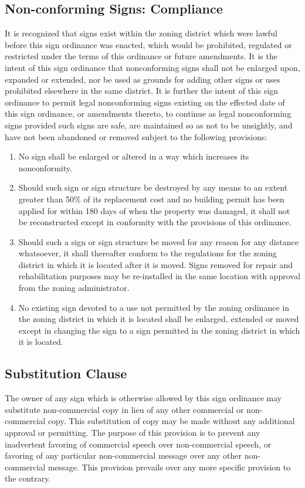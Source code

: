 \subsection{Non-conforming Signs: Compliance}
It is recognized that signs exist within the zoning district which were lawful before this sign ordinance was enacted, which would be prohibited, regulated or restricted under the terms of this ordinance or future amendments.  It is the intent of this sign ordinance that nonconforming signs shall not be enlarged upon, expanded or extended, nor be used as grounds for adding other signs or uses prohibited elsewhere in the same district.  It is further the intent of this sign ordinance to permit legal nonconforming signs existing on the effected date of this sign ordinance, or amendments thereto, to continue as legal nonconforming signs provided such signs are safe, are maintained so as not to be unsightly, and have not been abandoned or removed subject to the following provisions:
\begin{enumerate}[{\indent}1)]
    \item No sign shall be enlarged or altered in a way which increases its nonconformity.
    \item Should such sign or sign structure be destroyed by any means to an extent greater than 50\% of its replacement cost and no building permit has been applied for within 180 days of when the property was damaged, it shall not be reconstructed except in conformity with the provisions of this ordinance.
    \item Should such a sign or sign structure be moved for any reason for any distance whatsoever, it shall thereafter conform to the regulations for the zoning district in which it is located after it is moved.  Signs removed for repair and rehabilitation purposes may be re-installed in the same location with approval from the zoning administrator.
    \item No existing sign devoted to a use not permitted by the zoning ordinance in the zoning district in which it is located shall be enlarged, extended or moved except in changing the sign to a sign permitted in the zoning district in which it is located.
\end{enumerate}
\subsection{Substitution Clause}
The owner of any sign which is otherwise allowed by this sign ordinance may substitute non-commercial copy in lieu of any other commercial or non-commercial copy.  This substitution of copy may be made without any additional approval or permitting.  The purpose of this provision is to prevent any inadvertent favoring of commercial speech over non-commercial speech, or favoring of any particular non-commercial message over any other non-commercial message.  This provision prevails over any more specific provision to the contrary.

